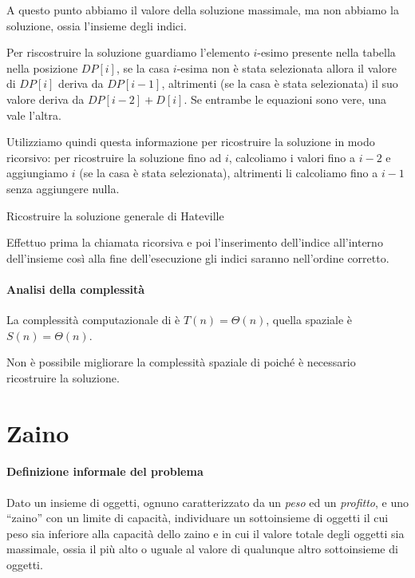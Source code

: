 A questo punto abbiamo il valore della soluzione massimale, ma non abbiamo la soluzione, ossia l'insieme degli indici.

Per riscostruire la soluzione guardiamo l'elemento \(i\)-esimo presente nella tabella nella posizione \(DP[i]\), se la casa \(i\)-esima non è stata selezionata allora il valore di \(DP[i]\) deriva da \(DP[i-1]\), altrimenti (se la casa è stata selezionata) il suo valore deriva da \(DP[i-2] + D[i]\).
Se entrambe le equazioni sono vere, una vale l'altra.

Utilizziamo quindi questa informazione per ricostruire la soluzione in modo ricorsivo: per ricostruire la soluzione fino ad \(i\), calcoliamo i valori fino a \(i-2\) e aggiungiamo \(i\) (se la casa è stata selezionata), altrimenti li calcoliamo fino a \(i-1\) senza aggiungere nulla.

\begin{algorithm}[H]
    \caption{Ricostruire la soluzione generale di Hateville}
    
\end{algorithm}

Effettuo prima la chiamata ricorsiva e poi l'inserimento dell'indice all'interno dell'insieme così alla fine dell'esecuzione gli indici saranno nell'ordine corretto.

\paragraph{Analisi della complessità}
La complessità computazionale di \hatevilleSolution è \(T(n) = \Theta(n)\), quella spaziale è \(S(n) = \Theta(n)\).

\begin{note}
Non è possibile migliorare la complessità spaziale di \hateville poiché è necessario ricostruire la soluzione.
\end{note}

\clearpage
\section{Zaino}

\paragraph{Definizione informale del problema}
Dato un insieme di oggetti, ognuno caratterizzato da un \emph{peso} ed un \emph{profitto}, e uno \enquote{zaino} con un limite di capacità, individuare un sottoinsieme di oggetti il cui peso sia inferiore alla capacità dello zaino e in cui il valore totale degli oggetti sia massimale, ossia il più alto o uguale al valore di qualunque altro sottoinsieme di oggetti.

